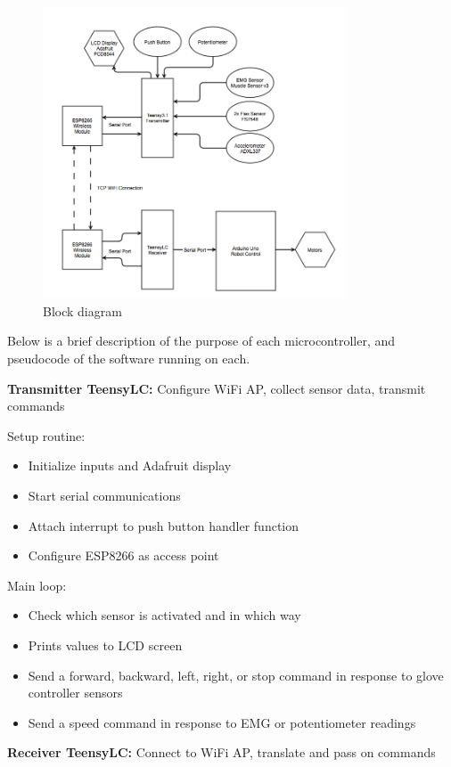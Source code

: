 \documentclass[12pt,scrartcl,titlepage]{article}
\begin{document}
\begin{figure}[h!]
  \centering
  \includegraphics[width=0.8\textwidth]{blkdgrm.png}
  \caption{Block diagram}
\end{figure}

  Below is a brief description of the purpose of each microcontroller, and pseudocode of the software running on each.

  \textbf{Transmitter TeensyLC:} Configure WiFi AP, collect sensor data, transmit commands
  
 {
  Setup routine:
  \begin{itemize}
    \item Initialize inputs and Adafruit display
    \item Start serial communications
    \item Attach interrupt to push button handler function
    \item Configure ESP8266 as access point
  \end{itemize}
  Main loop:
  \begin{itemize}
  \item Check which sensor is activated and in which way
  \item Prints values to LCD screen
  \item Send a forward, backward, left, right, or stop command in response to glove controller sensors
  \item Send a speed command in response to EMG or potentiometer readings
  \end{itemize}
}

 \textbf{Receiver TeensyLC:} Connect to WiFi AP, translate and pass on commands
\end{document}
